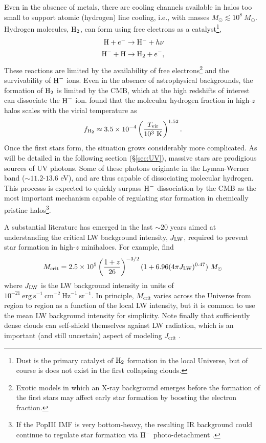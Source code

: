Even in the absence of metals, there are cooling channels available in halos too small to support atomic (hydrogen) line cooling, i.e., with masses $M_{\odot} \lesssim 10^8 \ M_{\odot}$. Hydrogen molecules, $\text{H}_2$, can form using free electrons as a catalyst\footnote{Dust is the primary catalyst of $\text{H}_2$ formation in the local Universe, but of course is does not exist in the first collapsing clouds.}, 
\begin{align}
	\text{H} + e^- & \rightarrow \text{H}^- + h\nu \\
	\text{H}^- + \text{H} & \rightarrow \text{H}_2 + e^- ,
\end{align}
These reactions are limited by the availability of free electrons\footnote{
Exotic models in which an X-ray background emerges before the formation of the first stars may affect early star formation by boosting the electron fraction.} and the survivability of $\text{H}^{-}$ ions. Even in the absence of astrophysical backgrounds, the formation of $\text{H}_2$ is limited by the CMB, which at the high redshifts of interest can dissociate the $\text{H}^{-}$ ion. \cite{Tegmark1997} found that the molecular hydrogen fraction in high-$z$ halos scales with the virial temperature as
\begin{equation}
	f_{\text{H}_2} \approx 3.5 \times 10^{-4} \left(\frac{T_{\text{vir}}}{10^3 \ \mathrm{K}} \right)^{1.52} .
\end{equation}
Once the first stars form, the situation grows considerably more complicated. As will be detailed in the following section (\S\ref{sec:UV}), massive stars are prodigious sources of UV photons. Some of these photons originate in the Lyman-Werner band ($\sim 11.2$-$13.6$ eV), and are thus capable of dissociating molecular hydrogen. This processs is expected to quickly surpass $\text{H}^{-}$ dissociation by the CMB as the most important mechanism capable of regulating star formation in chemically pristine halos\footnote{If the PopIII IMF is very bottom-heavy, the resulting IR background  could continue to regulate star formation via $\text{H}^{-}$ photo-detachment \cite{WolcottGreen2012}.}. 

A substantial literature has emerged in the last $\sim 20$ years aimed at understanding the critical LW background intensity, $J_{\text{LW}}$, required to prevent star formation in high-$z$ minihaloes. For example, \cite{Visbal2014} find
\begin{equation}
	M_{\mathrm{crit}} = 2.5 \times 10^5 \left(\frac{1+z}{26} \right)^{-3/2} (1 + 6.96(4\pi \JLW)^{0.47})  \ \Msun
\end{equation}
where $J_{\text{LW}}$ is the LW background intensity in units of $10^{-21} \ \mathrm{erg} \ \mathrm{s}^{-1} \ \mathrm{cm}^{-2} \ \mathrm{Hz}^{-1} \ \mathrm{sr}^{-1}$. In principle, $M_{\mathrm{crit}}$ varies across the Universe from region to region as a function of the local LW intensity, but it is common to use the mean LW background intensity for simplicity. Note finally that sufficiently dense clouds can self-shield themselves against LW radiation, which is an important (and still uncertain) aspect of modeling $J_{\mathrm{crit}}$ \cite{WolcottGreen2011}.

